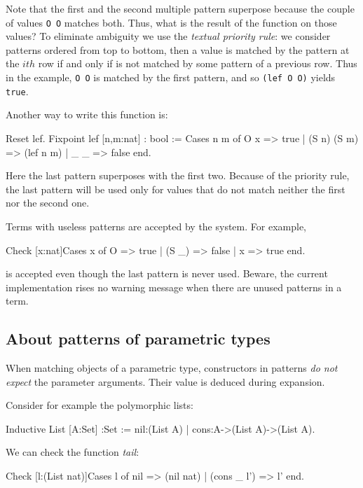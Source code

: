 Note that the first and the second  multiple pattern  superpose because the couple of
values \verb+O O+ matches both. Thus, what is the result of the
function on those values?
To eliminate ambiguity we use the {\em textual priority rule}: we
consider patterns ordered from top to bottom, then a value is matched
by the  pattern at the $ith$ row if and only if is not matched by some
pattern of a previous row. Thus in the example,
\verb+O O+ is matched by the first pattern, and so \verb+(lef O O)+
yields \verb+true+.

Another way to write  this function is:

\begin{coq_example}
Reset lef.
Fixpoint lef [n,m:nat] : bool :=
         Cases n m of
             O     x    => true  
          | (S n) (S m) => (lef n m)
          |  _     _    => false
         end.
\end{coq_example}


Here the last pattern superposes with the first two. Because
of the priority rule, the last pattern 
will be used only for values that do not match neither the  first nor
the second one.  

Terms with useless patterns are accepted by the
system. For example,
\begin{coq_example}
Check [x:nat]Cases x of O => true | (S _) => false | x => true end.
\end{coq_example}

is accepted even though the last pattern is never used.
Beware,  the
current implementation rises no warning message when there are unused
patterns in a term.




\subsection{About patterns of parametric types}
When matching objects of a parametric type, constructors in patterns
{\em do not expect} the parameter arguments. Their value is deduced
during expansion.

Consider for example the polymorphic lists:

\begin{coq_example}
Inductive List [A:Set] :Set := 
  nil:(List A) 
| cons:A->(List A)->(List A).
\end{coq_example}

We can check the function {\em tail}:

\begin{coq_example}
Check [l:(List nat)]Cases l of 
                             nil        => (nil nat)
                          | (cons _ l') => l'
                           end.
\end{coq_example}


